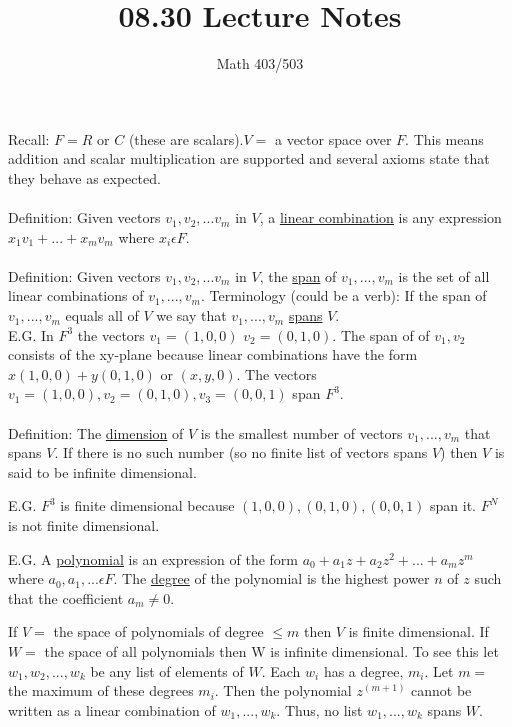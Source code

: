 \documentclass{article}
\title{08.30 Lecture Notes}
\author{Math 403/503 }
\begin{document}
\maketitle

Recall: $F = R$ or $C$ (these are scalars).$V =$ a vector space over $F$. This means addition and scalar multiplication are supported and several axioms state that they behave as expected. \\ \\
Definition: Given vectors $v_1, v_2, ... v_m$ in $V$, a \underline{linear combination} is any expression $x_1v_1 + ... + x_mv_m$ where $x_i \epsilon F$. \\ \\
Definition: Given vectors $v_1, v_2, ... v_m$ in $V$, the \underline{span} of $v_1, ..., v_m$ is the set of all linear combinations of $v_1, ..., v_m$. Terminology (could be a verb): If the span of $v_1, ..., v_m$ equals all of $V$ we say that $v_1, ..., v_m$ \underline{spans} $V$.\\

E.G. In $F^3$ the vectors $v_1 = (1, 0, 0)$ $v_2 = (0, 1, 0)$. The span of of $v_1, v_2$ consists of the xy-plane because linear combinations have the form $x(1, 0, 0) + y(0, 1, 0)$ or $(x, y, 0)$. The vectors $v_1 = (1, 0, 0), v_2 = (0, 1, 0), v_3 = (0, 0, 1)$ span $F^3$.\\\\
Definition: The \underline{dimension} of $V$ is the smallest number of vectors $v_1, ..., v_m$ that spans $V$. If there is no such number (so no finite list of vectors spans $V$) then $V$ is said to be infinite dimensional. 

E.G. $F^3$ is finite dimensional because $(1, 0, 0), (0, 1, 0), (0, 0, 1)$ span it. $F^N$ is not finite dimensional. 

E.G. A \underline{polynomial} is an expression of the form $a_0 + a_1z + a_2z^2 + ... + a_mz^m$ where $a_0, a_1, ... \epsilon F$. The \underline{degree} of the polynomial is the highest power $n$ of $z$ such that the coefficient $a_m \neq 0$.

If $V =$ the space of polynomials of degree $\leq m$ then $V$ is finite dimensional. If $W = $ the space of all polynomials then W is infinite dimensional. To see this let $w_1, w_2, ..., w_k$ be any list of elements of $W$. Each $w_i$ has a degree, $m_i$. Let $m=$ the maximum of these degrees $m_i$. Then the polynomial $z^(m+1)$ cannot be written as a linear combination of $w_1, ..., w_k$. Thus, no list $w_1, ..., w_k$ spans $W$.\\
\end{document}
